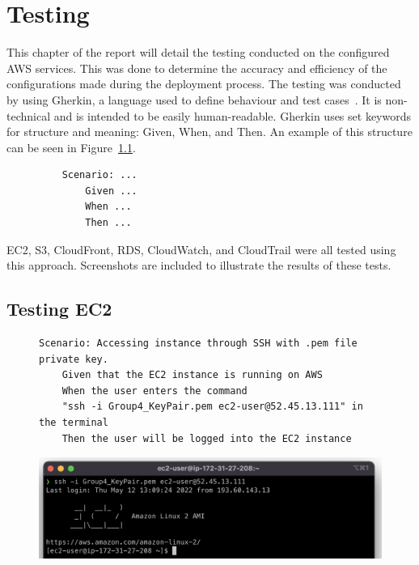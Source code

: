 \chapter{Testing}\label{ch:testing}

This chapter of the report will detail the testing conducted on the configured AWS services.
This was done to determine the accuracy and efficiency of the configurations made during the deployment process.
The testing was conducted by using Gherkin, a language used to define behaviour and test
cases~\parencite{dos2018automated}.
It is non-technical and is intended to be easily human-readable.
Gherkin uses set keywords for structure and meaning: Given, When, and Then.
An example of this structure can be seen in Figure~\ref{fig:gherkin}.

\begin{figure}[!htbp]
    \centering
    \begin{verbatim}
    Scenario: ...
        Given ...
        When ...
        Then ...
    \end{verbatim}
    \label{fig:gherkin}
\end{figure}

EC2, S3, CloudFront, RDS, CloudWatch, and CloudTrail were all tested using this approach.
Screenshots are included to illustrate the results of these tests.

\section{Testing EC2}\label{sec:testing-ec2}

\begin{figure}[!htbp]
    \centering
    \begin{verbatim}
Scenario: Accessing instance through SSH with .pem file private key.
    Given that the EC2 instance is running on AWS
    When the user enters the command
    "ssh -i Group4_KeyPair.pem ec2-user@52.45.13.111" in the terminal
    Then the user will be logged into the EC2 instance
    \end{verbatim}
    \label{fig:accessing-instance-ec2}
\end{figure}

\begin{figure}[!htbp]
    \centering
    \includegraphics[width=\textwidth]{resources/ec2/ec2-logged-in}
    \label{fig:ec2-test-logged-in}
\end{figure}


